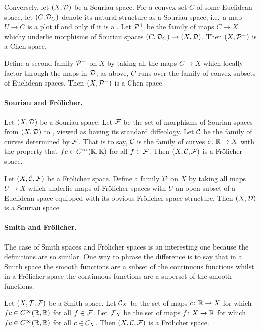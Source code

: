 \documentclass[%
12pt,%
arxiv,%
defaults
]{myclass}
\begin{document}
Conversely, let \((X, \mathcal{D})\) be a Souriau space.
For a convex set \(C\) of some Euclidean space, let \((C, \mathcal{D}_C)\) denote its natural structure as a Souriau space; i.e.\ a map \(U \to C\) is a plot if and only if it is a \cimap.
Let \(\mathcal{P}^+\) be the family of maps \(C \to X\) whichy underlie morphisms of Souriau spaces \((C, \mathcal{D}_C) \to (X, \mathcal{D})\).
Then \((X, \mathcal{P}^+)\) is a Chen space.

Define a second family \(\mathcal{P}^-\) on \(X\) by taking all the maps \(C \to X\) which locally factor through the maps in \(\mathcal{D}\); as above, \(C\) runs over the family of convex subsets of Euclidean spaces.
Then \((X, \mathcal{P}^-)\) is a Chen space.

\paragraph{Souriau and Fr\"olicher.}

Let \((X, \mathcal{D})\) be a Souriau space.
Let \(\mathcal{F}\) be the set of morphisms of Sourian spaces from \((X, \mathcal{D})\) to \R, viewed as having its standard diffeology.
Let \(\mathcal{C}\) be the family of curves determined by \(\mathcal{F}\).
That is to say, \(\mathcal{C}\) is the family of curves \(c \colon \mathbb{R} \to X\) with the property that \(f c \in C^\infty(\mathbb{R},\mathbb{R})\) for all \(f \in \mathcal{F}\).
Then \((X, \mathcal{C}, \mathcal{F})\) is a Fr\"olicher space.


Let \((X, \mathcal{C}, \mathcal{F})\) be a Fr\"olicher space.
Define a family \(\mathcal{D}\) on \(X\) by taking all maps \(U \to X\) which underlie maps of Fr\"olicher spaces with \(U\) an open subset of a Euclidean space equipped with its obvious Fr\"olicher space structure.
Then \((X, \mathcal{D})\) is a Souriau space.

\paragraph{Smith and Fr\"olicher.}

The case of Smith spaces and Fr\"olicher spaces is an interesting one because the definitions are so similar.
One way to phrase the difference is to say that in a Smith space the smooth functions are a subset of the continuous functions whilst in a Fr\"olicher space the continuous functions are a superset of the smooth functions.

Let \((X, \mathcal{T}, \mathcal{F})\) be a Smith space.
Let \(\mathcal{C}_X\) be the set of maps \(c \colon \mathbb{R} \to X\) for which \(f c \in C^\infty(\mathbb{R}, \mathbb{R})\) for all \(f \in \mathcal{F}\).
Let \(\mathcal{F}_X\) be the set of maps \(f \colon X \to \mathbb{R}\) for which \(f c \in C^\infty(\mathbb{R},\mathbb{R})\) for all \(c \in \mathcal{C}_X\).
Then \((X, \mathcal{C}, \mathcal{F})\) is a Fr\"olicher space.
\end{document}
